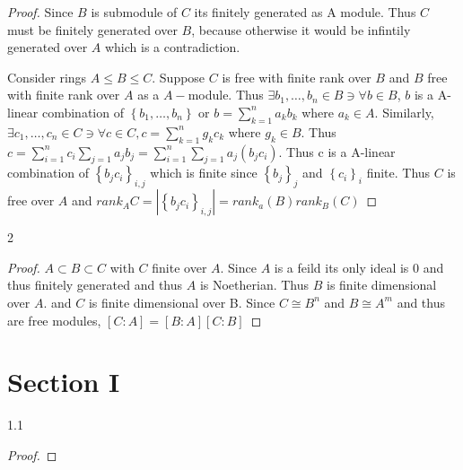 \documentclass{article}
\begin{document}
\begin{proof}
    Since $B$ is submodule of $C$ its finitely generated as A module. Thus $C$ must be finitely generated over $B$, because otherwise it would be infintily generated over $A$ which is a contradiction.     



    Consider rings $A \leq B \leq C$. Suppose $C$ is free with finite rank over $B$ and $B$ free with finite rank over $A$ as a $A-$module. Thus $\exists b_1, \dots, b_n \in B \ni \forall b \in B$, $b$ is a A-linear combination of $\left\{ b_1, \dots, b_n \right\}$ or $b = \sum_{k = 1}^{n}a_k b_k$ where $a_k \in A$. Similarly, $\exists c_1, \dots, c_n \in C \ni \forall c \in C, c = \sum_{k = 1}^{n} g_k c_k$ where $g_k \in B$. Thus $c = \sum_{i = 1}^{n} c_i \sum_{j = 1} a_j b_j = \sum_{i = 1}^{n}  \sum_{j = 1} a_j (b_j c_i)$. Thus c is a A-linear combination of $\left\{ b_jc_i \right\}_{i,j}$ which is finite since $\left\{ b_j \right\}_j$ and $\left\{ c_i \right\}_i$ finite. Thus $C$ is free over $A$ and $rank_A C = |\left\{ b_j c_i \right\}_{i, j}| = rank_a(B) rank_B(C)$    

    
\end{proof}

\bigskip

\begin{PROB}{2}\label{Problem 2.}
\end{PROB}
\begin{proof}
    $A \subset B \subset C$ with $C$ finite over $A$. Since $A$ is a feild its only ideal is $0$ and thus finitely generated and thus $A$ is Noetherian. Thus $B$ is finite dimensional over $A$. and $C$ is finite dimensional over B. Since $C \cong B^n$ and $B \cong A^m$ and thus are free modules, $[C : A] = [B : A][C : B]$              
\end{proof}

\section{Section I}
\begin{PROB}{1.1}\label{Problem 1.1.}
\end{PROB}
\begin{proof}
    
\end{proof}

\bigskip
\end{document}
